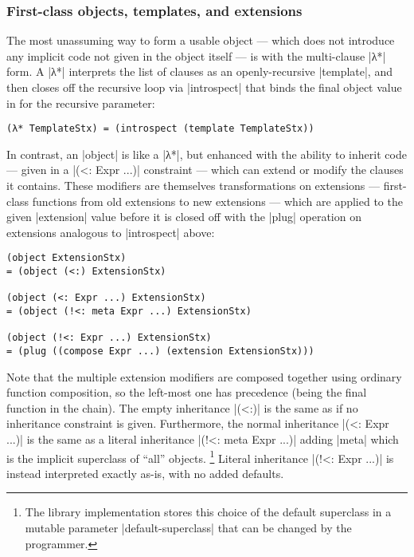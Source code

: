 \subsubsection{First-class objects, templates, and extensions}

The most unassuming way to form a usable object --- which does not introduce any implicit code not given in the object itself --- is with the multi-clause \scm|λ*| form.  A \scm|λ*| interprets the list of clauses as an openly-recursive \scm|template|, and then closes off the recursive loop via \scm|introspect| that binds the final object value in for the recursive parameter:
\begin{verbatim}
(λ* TemplateStx) = (introspect (template TemplateStx))
\end{verbatim}

In contrast, an \scm|object| is like a \scm|λ*|, but enhanced with the ability to inherit code --- given in a \scm|(<: Expr ...)| constraint --- which can extend or modify the clauses it contains.
These modifiers are themselves transformations on extensions --- first-class functions from old extensions to new extensions --- which are applied to the given \scm|extension| value before it is closed off with the \scm|plug| operation on extensions analogous to \scm|introspect| above:
\begin{verbatim}
(object ExtensionStx)
= (object (<:) ExtensionStx)

(object (<: Expr ...) ExtensionStx)
= (object (!<: meta Expr ...) ExtensionStx)

(object (!<: Expr ...) ExtensionStx)
= (plug ((compose Expr ...) (extension ExtensionStx)))

\end{verbatim}
Note that the multiple extension modifiers are composed together using ordinary function composition, so the left-most one has precedence (being the final function in the chain).
The empty inheritance \scm|(<:)| is the same as if no inheritance constraint is given.
Furthermore, the normal inheritance \scm|(<: Expr ...)| is the same as a literal inheritance \scm|(!<: meta Expr ...)| adding \scm|meta| which is the implicit superclass of ``all'' objects.%
\footnote{The library implementation stores this choice of the default superclass in a mutable parameter \scm|default-superclass| that can be changed by the programmer.}
Literal inheritance \scm|(!<: Expr ...)| is instead interpreted exactly as-is, with no added defaults.

